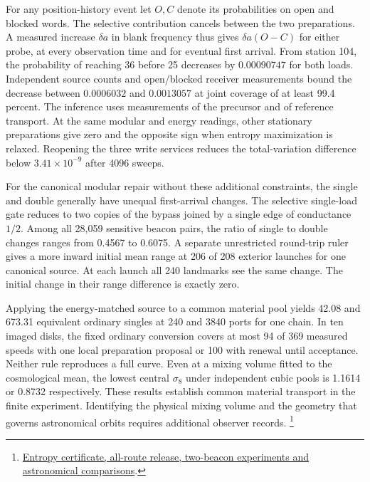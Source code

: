 \documentclass[11pt]{article}
\begin{document}
For any position-history event let \(O,C\) denote its probabilities on
open and blocked words. The selective contribution cancels between the
two preparations. A measured increase \(\delta a\) in blank frequency
thus gives \(\delta a(O-C)\) for either probe, at every observation time
and for eventual first arrival. From station 104, the probability of
reaching 36 before 25 decreases by \(0.00090747\) for both loads.
Independent source counts and open/blocked receiver measurements bound
the decrease between \(0.0006032\) and \(0.0013057\) at joint coverage
of at least 99.4 percent. The inference uses measurements of the
precursor and of reference transport. At the same modular and energy
readings, other stationary preparations give zero and the opposite sign
when entropy maximization is relaxed. Reopening the three write services
reduces the total-variation difference below \(3.41\times10^{-9}\)
after 4096 sweeps.

For the canonical modular repair without these additional constraints,
the single and double generally have unequal first-arrival changes.
The selective single-load gate reduces to two copies of the bypass
joined by a single edge of conductance \(1/2\). Among all 28,059
sensitive beacon pairs, the ratio of single to double changes ranges
from 0.4567 to 0.6075. A separate unrestricted round-trip ruler gives
a more inward initial mean range at 206 of 208 exterior launches for
one canonical source. At each launch all 240 landmarks see the same
change. The initial change in their range difference is exactly zero.

Applying the energy-matched source to a common material pool yields
42.08 and 673.31 equivalent ordinary singles at 240 and 3840 ports for
one chain. In ten imaged disks, the fixed ordinary conversion covers
at most 94 of 369 measured speeds with one local preparation proposal
or 100 with renewal until acceptance. Neither rule reproduces a full
curve. Even at a mixing volume fitted to the cosmological mean, the
lowest central \(\sigma_8\) under independent cubic pools is 1.1614 or
0.8732 respectively. These results establish common material transport
in the finite experiment. Identifying the physical mixing volume and
the geometry that governs astronomical orbits requires additional
observer records.%
\footnote{\href{https://github.com/FloatingPragma/observer-patch-holography/blob/main/model/experiments/interval_echo_shell_flux/product_address/green_response/material_recoil/overlap_source/native_boundary/stock/aperture/LANDMARK_RESULTS.md}{Entropy certificate, all-route release, two-beacon experiments and astronomical comparisons}.}
\end{document}
